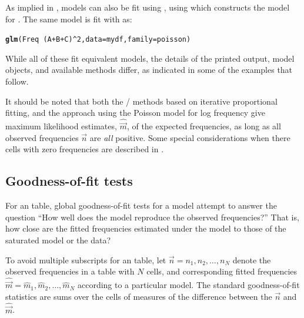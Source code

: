 \documentclass[11pt]{book}\usepackage[]{graphicx}\usepackage[]{color}
\makeatletter
\newcommand{\hlnum}[1]{\textcolor[rgb]{0.686,0.059,0.569}{#1}}%
\newcommand{\hlopt}[1]{\textcolor[rgb]{0,0,0}{#1}}%
\newcommand{\hlstd}[1]{\textcolor[rgb]{0.345,0.345,0.345}{#1}}%
\newcommand{\hlkwc}[1]{\textcolor[rgb]{0.333,0.667,0.333}{#1}}%
\newcommand{\hlkwd}[1]{\textcolor[rgb]{0.737,0.353,0.396}{\textbf{#1}}}%
\newenvironment{kframe}{%
 \def\at@end@of@kframe{}%
 \ifinner\ifhmode%
  \def\at@end@of@kframe{\end{minipage}}%
  \begin{minipage}{\columnwidth}%
 \fi\fi%
 \def\FrameCommand##1{\hskip\@totalleftmargin \hskip-\fboxsep
 \colorbox{shadecolor}{##1}\hskip-\fboxsep
     \hskip-\linewidth \hskip-\@totalleftmargin \hskip\columnwidth}%
 \MakeFramed {\advance\hsize-\width
   \@totalleftmargin\z@ \linewidth\hsize
   \@setminipage}}%
 {\par\unskip\endMakeFramed%
 \at@end@of@kframe}
\newenvironment{knitrout}{}{} %
\renewenvironment{knitrout}{\small\renewcommand{\baselinestretch}{.85}}{} %
\makeatother
\begin{document}
As implied in , \loglin models can also be fit
using , using  which constructs the
model for .  The same model is fit with 
as:
\begin{knitrout}
\color{fgcolor}\begin{kframe}
\begin{alltt}
\hlkwd{glm}\hlstd{(Freq} \hlopt{~} \hlstd{(A} \hlopt{+} \hlstd{B} \hlopt{+} \hlstd{C)}\hlopt{^}\hlnum{2}\hlstd{,} \hlkwc{data}\hlstd{=mydf,} \hlkwc{family}\hlstd{=poisson)}
\end{alltt}
\end{kframe}
\end{knitrout}
While all of these fit equivalent models, the details of the printed output,
model objects, and available methods differ, as indicated in some of the examples
that follow.

It should be noted that both the / methods based
on iterative proportional fitting, and the  approach using
the Poisson model for log frequency give maximum likelihood estimates,
$\widehat{\vec{m}}$, of the expected frequencies, as long as all
observed frequencies $\vec{n}$ are \emph{all} positive.
Some special considerations when there cells with
zero frequencies are described in .


\subsection{Goodness-of-fit tests} \label{sec:loglin-goodfit}

For an \nway table, global goodness-of-fit tests for a \loglin model
attempt to answer the question ``How well does the model reproduce
the observed frequencies?'' That is, how close are the fitted frequencies
estimated under the model to those of the saturated model or the data?

To avoid multiple subscripts for an \nway table,
let $\vec{n} = n_1, n_2, \ldots , n_N$ denote
the observed frequencies in a table with $N$ cells, and
corresponding fitted frequencies
$\widehat{\vec{m}} = \widehat{m}_1, \widehat{m}_2, \ldots , \widehat{m}_N$
according to a particular \loglin model.
The standard goodness-of-fit statistics are sums over the cells
of measures of the difference between the $\vec{n}$ and $\widehat{\vec{m}}$.
\end{document}
